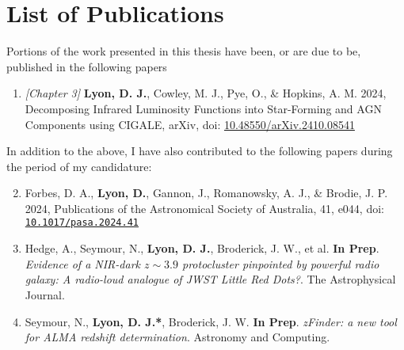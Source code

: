 \chapter{List of Publications}
\thispagestyle{empty}

Portions of the work presented in this thesis have been, or are due to be, published in the following papers

\vspace{0.5cm}
\begin{enumerate}
    \item \textit{[Chapter 3]} \textbf{Lyon, D. J.}, Cowley, M. J., Pye, O., \& Hopkins, A. M. 2024, Decomposing Infrared Luminosity Functions into Star-Forming and AGN Components using CIGALE, arXiv, doi: \href{http://doi.org/10.48550/arXiv.2410.08541}{10.48550/arXiv.2410.08541}
\end{enumerate}

\vspace{0.5cm}
\noindent
In addition to the above, I have also contributed to the following papers during the
period of my candidature:

\vspace{0.5cm}
\begin{enumerate}
    \setcounter{enumi}{1}
    
    \item Forbes, D. A., \textbf{Lyon, D.}, Gannon, J., Romanowsky, A. J., \& Brodie, J. P. 2024, Publications of the Astronomical Society of Australia, 41, e044, doi: \href{https://doi.org/10.1017/pasa.2024.41}{\nolinkurl{10.1017/pasa.2024.41}}
    
    \item Hedge, A., Seymour, N., \textbf{Lyon, D. J.}, Broderick, J. W., et al. \textbf{In Prep}. \textit{Evidence of a NIR-dark $z\sim3.9$ protocluster pinpointed by powerful radio galaxy: A radio-loud analogue of {\it JWST} Little Red Dots?}. The Astrophysical Journal.

    \item Seymour, N., \textbf{Lyon, D. J.*}, Broderick, J. W. \textbf{In Prep}. \textit{zFinder: a new tool for ALMA redshift determination}. Astronomy and Computing.
\end{enumerate}